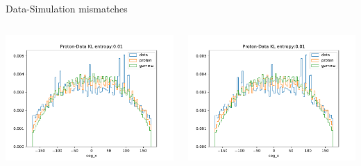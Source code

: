 \begin{frame}[t]{Data-Simulation mismatches}
\begin{columns}[onlytextwidth]
    \begin{column}{0.475\textwidth}
        \includegraphics[width=1.1\textwidth,page=9]{fig/feature_comp_cuts.pdf}
    \end{column}
    \begin{column}{0.475\textwidth}
        \includegraphics[width=1.1\textwidth,page=17]{fig/feature_comp_cuts.pdf}
    \end{column}
\end{columns}
\end{frame}

